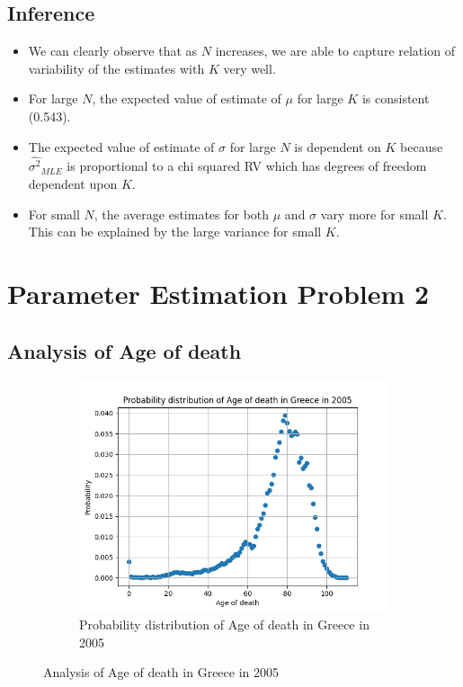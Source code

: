 \documentclass[fleqn, 11pt]{article}
\begin{document}
\subsection{Inference}
\begin{itemize}
    \item We can clearly observe that as $N$ increases, we are able to capture relation of variability of the estimates with $K$ very well.
    \item For large $N$, the expected value of estimate of $\mu$ for large $K$ is consistent (0.543).
    \item The expected value of estimate of $\sigma$ for large $N$ is dependent on $K$ because $\hat{\sigma^2}_{MLE}$ is proportional to a chi squared RV which has degrees of freedom dependent upon $K$.
    \item For small $N$, the average estimates for both $\mu$ and $\sigma$ vary more for small $K$. \\
          This can be explained by the large variance for small $K$.
\end{itemize}


\newpage
\section{Parameter Estimation Problem 2}
\setcounter{figure}{0}
\subsection{Analysis of Age of death}
\begin{figure}[H]
    \centering
    \begin{subfigure}[H]{0.59\textwidth}
        \centering
        \includegraphics[width=\textwidth]{P2/plot.png}
        \caption[]{Probability distribution of Age of death in Greece in 2005}
    \end{subfigure}
    \caption{Analysis of Age of death in Greece in 2005}
\end{figure}
\end{document}
